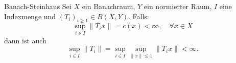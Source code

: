 	\begin{karte}{Banach-Steinhaus}
		Sei $X$ ein Banachraum, $Y$ ein normierter Raum, $I$ eine Indexmenge und $(T_{i})_{i \geq 1} \in B(X, Y)$.
		Falls:
		\[ \sup_{i \in I} \| T_{i} x \| = c(x) < \infty, \quad \forall x \in X \]
		dann ist auch
		\[ \sup_{i \in I} \| T_{i} \| = \sup_{i \in I} \sup_{\| x \| \leq 1} \| T_{i} x \| < \infty. \]
	\end{karte}
